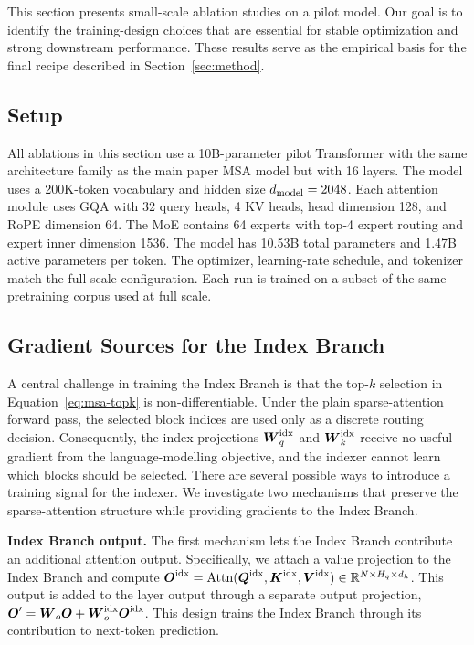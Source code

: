 \documentclass{llmxive}
\providecommand{\bm}[1]{\boldsymbol{#1}}
\providecommand{\method}{\textsc{MSA}}
\providecommand{\Secref}[1]{Section~\ref{#1}}
\providecommand{\Eqref}[1]{Equation~\ref{#1}}
\providecommand{\mK}{{\bm{K}}}
\providecommand{\mO}{{\bm{O}}}
\providecommand{\mQ}{{\bm{Q}}}
\providecommand{\mV}{{\bm{V}}}
\providecommand{\mW}{{\bm{W}}}
\begin{document}
This section presents small-scale ablation studies on a pilot model. Our goal is to identify the training-design choices that are essential for stable optimization and strong downstream performance. These results serve as the empirical basis for the final recipe described in \Secref{sec:method}.

\subsection{Setup}
\label{app:prelim-setup}

All ablations in this section use a 10B-parameter pilot Transformer with the same architecture family as the main paper \method{} model but with 16 layers. The model uses a 200K-token vocabulary and hidden size $d_{\rm model}=2048$. Each attention module uses GQA with 32 query heads, 4 KV heads, head dimension 128, and RoPE dimension 64. The MoE contains 64 experts with top-4 expert routing and expert inner dimension 1536. The model has 10.53B total parameters and 1.47B active parameters per token. The optimizer, learning-rate schedule, and tokenizer match the full-scale configuration. Each run is trained on a subset of the same pretraining corpus used at full scale.


\subsection{Gradient Sources for the Index Branch}
\label{app:prelim-grad-source}

A central challenge in training the Index Branch is that the top-$k$ selection in \Eqref{eq:msa-topk} is non-differentiable. Under the plain sparse-attention forward pass, the selected block indices are used only as a discrete routing decision. Consequently, the index projections $\mW^{\rm idx}_q$ and $\mW^{\rm idx}_k$ receive no useful gradient from the language-modelling objective, and the indexer cannot learn which blocks should be selected.
There are several possible ways to introduce a training signal for the indexer. We investigate two mechanisms that preserve the sparse-attention structure while providing gradients to the Index Branch.

\textbf{Index Branch output.} The first mechanism lets the Index Branch contribute an additional attention output. Specifically, we attach a value projection to the Index Branch and compute $\mO^{\rm idx}=\mathrm{Attn}(\mQ^{\rm idx}, \mK^{\rm idx}, \mV^{\rm idx})\in \mathbb{R}^{N \times H_q \times d_h}$. This output is added to the layer output through a separate output projection, $\mO'=\mW_o \mO+\mW^{\rm idx}_o \mO^{\rm idx}$. 
This design trains the Index Branch through its contribution to next-token prediction.
\end{document}
